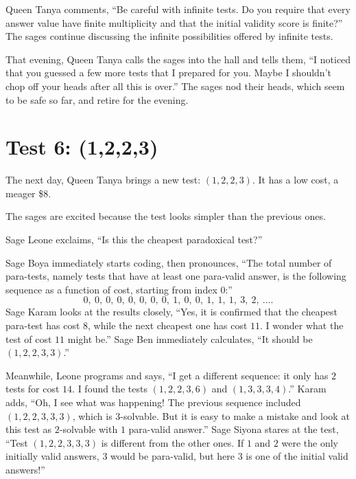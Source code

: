 \documentclass[12pt,reqno]{article}
\theoremstyle{plain}
\theoremstyle{definition}
\theoremstyle{remark}
\begin{document}
Queen Tanya comments, ``Be careful with infinite tests. Do you require that every answer value have finite multiplicity and that the initial validity score is finite?'' The sages continue discussing the infinite possibilities offered by infinite tests.

That evening, Queen Tanya calls the sages into the hall and tells them, ``I noticed that you guessed a few more tests that I prepared for you. Maybe I shouldn't chop off your heads after all this is over.'' The sages nod their heads, which seem to be safe so far, and retire for the evening.


\section{Test 6: (1,2,2,3)}

The next day, Queen Tanya brings a new test: $(1,2,2,3)$. It has a low cost, a meager \$8.

The sages are excited because the test looks simpler than the previous ones.

Sage Leone exclaims, ``Is this the cheapest paradoxical test?''

Sage Boya immediately starts coding, then pronounces, ``The total number of para-tests, namely tests that have at least one para-valid answer, is the following sequence as a function of cost, starting from index $0$:''
\[0,\ 0,\ 0,\ 0,\ 0,\ 0,\ 0,\ 0,\ 1,\ 0,\ 0,\ 1,\ 1,\ 1,\ 3,\ 2,\ \ldots.\]
Sage Karam looks at the results closely, ``Yes, it is confirmed that the cheapest para-test has cost $8$, while the next cheapest one has cost $11$. I wonder what the test of cost $11$ might be.'' Sage Ben immediately calculates, ``It should be $(1,2,2,3,3)$.''

Meanwhile, Leone programs and says, ``I get a different sequence: it only has $2$ tests for cost $14$. I found the tests $(1,2,2,3,6)$ and $(1,3,3,3,4)$.'' Karam adds, ``Oh, I see what was happening! The previous sequence included $(1,2,2,3,3,3)$, which is $3$-solvable. But it is easy to make a mistake and look at this test as $2$-solvable with $1$ para-valid answer.'' Sage Siyona stares at the test, ``Test $(1,2,2,3,3,3)$ is different from the other ones. If $1$ and $2$ were the only initially valid answers, $3$ would be para-valid, but here $3$ is one of the initial valid answers!''
\end{document}
